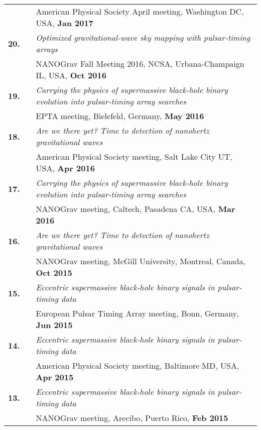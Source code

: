 \documentclass[11pt,letterpaper,sans]{moderncv}
\begin{document}
{\begin{longtable}{rp{0.3cm}p{15.8cm}}
&& American Physical Society April meeting, Washington DC, USA, \textbf{Jan 2017} \vspace{0.09cm}\\
\textbf{20.} & & \textit{Optimized gravitational-wave sky mapping with pulsar-timing arrays} \\ 
&& NANOGrav Fall Meeting 2016, NCSA, Urbana-Champaign IL, USA, \textbf{Oct 2016} \vspace{0.09cm}\\
\textbf{19.} & & \textit{Carrying the physics of supermassive black-hole binary evolution into pulsar-timing array searches} \\ 
&& EPTA meeting, Bielefeld, Germany, \textbf{May 2016} \vspace{0.09cm}\\
\textbf{18.} & & \textit{Are we there yet? Time to detection of nanohertz gravitational waves} \\ 
&& American Physical Society meeting, Salt Lake City UT, USA, \textbf{Apr 2016} \vspace{0.09cm}\\
\textbf{17.} & & \textit{Carrying the physics of supermassive black-hole binary evolution into pulsar-timing array searches} \\ 
&& NANOGrav meeting, Caltech, Pasadena CA, USA, \textbf{Mar 2016} \vspace{0.09cm}\\
\textbf{16.} & & \textit{Are we there yet? Time to detection of nanohertz gravitational waves} \\ 
&& NANOGrav meeting, McGill University, Montreal, Canada, \textbf{Oct 2015} \vspace{0.09cm}\\
\textbf{15.} & & \textit{Eccentric supermassive black-hole binary signals in pulsar-timing data} \\ 
&& European Pulsar Timing Array meeting, Bonn, Germany, \textbf{Jun 2015} \vspace{0.09cm}\\
\textbf{14.} & & \textit{Eccentric supermassive black-hole binary signals in pulsar-timing data} \\ 
&& American Physical Society meeting, Baltimore MD, USA, \textbf{Apr 2015} \vspace{0.09cm}\\
\textbf{13.} & & \textit{Eccentric supermassive black-hole binary signals in pulsar-timing data} \\ 
&& NANOGrav meeting, Arecibo, Puerto Rico, \textbf{Feb 2015} \vspace{0.09cm}\\

\end{longtable}}
\end{document}
